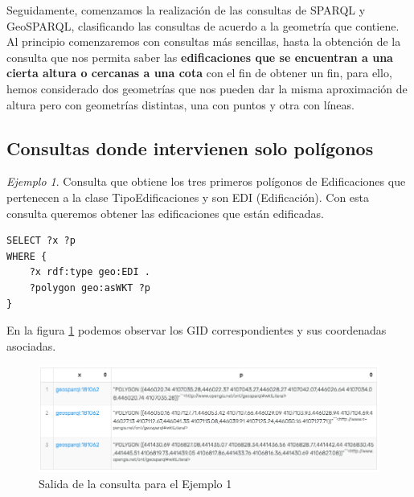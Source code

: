 Seguidamente, comenzamos la realización de las consultas de SPARQL y GeoSPARQL, clasificando las consultas de acuerdo a la geometría que contiene. Al principio comenzaremos con consultas más sencillas, hasta la obtención de la consulta que nos permita saber las \textbf{edificaciones que se encuentran a una cierta altura o cercanas a una cota} con el fin de obtener un fin, para ello, hemos considerado dos geometrías que nos pueden dar la misma aproximación de altura pero con geometrías distintas, una con puntos y otra con líneas.




\subsection{Consultas donde intervienen solo polígonos}

\textit{Ejemplo 1}. Consulta que obtiene los tres primeros polígonos de Edificaciones que pertenecen a la clase TipoEdificaciones y son EDI (Edificación). Con esta consulta queremos obtener las edificaciones que están edificadas. 

\vspace*{0.2cm}

\begin{lstlisting}
SELECT ?x ?p
WHERE {
	?x rdf:type geo:EDI .
	?polygon geo:asWKT ?p
}
\end{lstlisting}

\vspace*{0.2cm}

En la figura \ref{fig:salida3} podemos observar los GID correspondientes y sus coordenadas asociadas.

\begin{figure}[H]
	\centering
	\includegraphics[width=1\linewidth]{imagenes/capitulo5/salida3}
	\caption{Salida de la consulta para el Ejemplo 1}
	\label{fig:salida3}
\end{figure}

